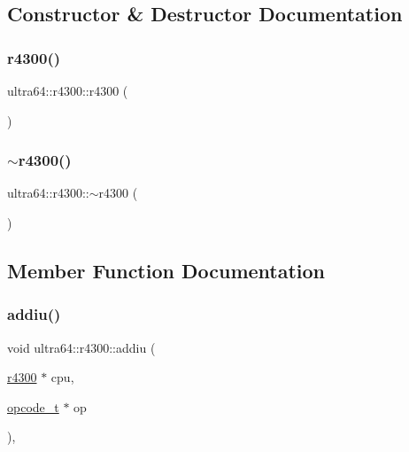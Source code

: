 \subsection{Constructor \& Destructor Documentation}
\mbox{\label{classultra64_1_1r4300_a3237ff90dc6eeaa7110134651af7502c}} 
\subsubsection{\texorpdfstring{r4300()}{r4300()}}
{\footnotesize\ttfamily ultra64\+::r4300\+::r4300 (\begin{DoxyParamCaption}{ }\end{DoxyParamCaption})}

\mbox{\label{classultra64_1_1r4300_a75254779ac5739caaacac21bebe073de}} 
\subsubsection{\texorpdfstring{$\sim$r4300()}{~r4300()}}
{\footnotesize\ttfamily ultra64\+::r4300\+::$\sim$r4300 (\begin{DoxyParamCaption}{ }\end{DoxyParamCaption})}



\subsection{Member Function Documentation}
\mbox{\label{classultra64_1_1r4300_a2818243049b2f4c70c8b5800a908c51b}} 
\subsubsection{\texorpdfstring{addiu()}{addiu()}}
{\footnotesize\ttfamily void ultra64\+::r4300\+::addiu (\begin{DoxyParamCaption}\item[{\hyperlink{classultra64_1_1r4300}{r4300} $\ast$}]{cpu,  }\item[{\hyperlink{classultra64_1_1opcode__t}{opcode\+\_\+t} $\ast$}]{op }\end{DoxyParamCaption})\hspace{0.3cm}{\ttfamily [static]}, {\ttfamily [private]}}

